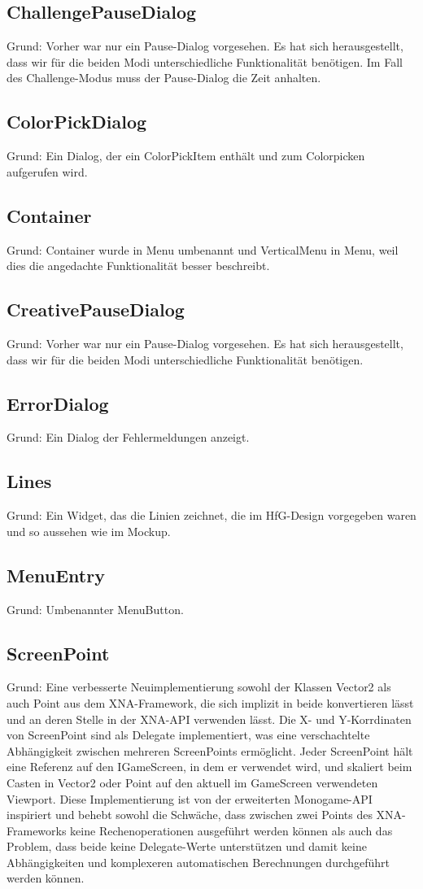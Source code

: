 \subsection{ChallengePauseDialog}
Grund: Vorher war nur ein Pause-Dialog vorgesehen. Es hat sich herausgestellt, dass wir für die beiden Modi unterschiedliche Funktionalität benötigen. Im Fall des Challenge-Modus muss der Pause-Dialog die Zeit anhalten.
\subsection{ColorPickDialog}
Grund: Ein Dialog, der ein ColorPickItem enthält und zum Colorpicken aufgerufen wird.
\subsection{Container}
Grund: Container wurde in Menu umbenannt und VerticalMenu in Menu, weil dies die angedachte Funktionalität besser beschreibt.
\subsection{CreativePauseDialog}
Grund: Vorher war nur ein Pause-Dialog vorgesehen. Es hat sich herausgestellt, dass wir für die beiden Modi unterschiedliche Funktionalität benötigen.
\subsection{ErrorDialog}
Grund: Ein Dialog der Fehlermeldungen anzeigt.
\subsection{Lines}
Grund: Ein Widget, das die Linien zeichnet, die im HfG-Design vorgegeben waren und so aussehen wie im Mockup.
\subsection{MenuEntry}
Grund: Umbenannter MenuButton.
\subsection{ScreenPoint}
Grund: Eine verbesserte Neuimplementierung sowohl der Klassen Vector2 als auch Point aus dem XNA-Framework, die sich implizit in beide konvertieren lässt und an deren Stelle in der XNA-API verwenden lässt. Die X- und Y-Korrdinaten von ScreenPoint sind als Delegate implementiert, was eine verschachtelte Abhängigkeit zwischen mehreren ScreenPoints ermöglicht. Jeder ScreenPoint hält eine Referenz auf den IGameScreen, in dem er verwendet wird, und skaliert beim Casten in Vector2 oder Point auf den aktuell im GameScreen verwendeten Viewport. Diese Implementierung ist von der erweiterten Monogame-API inspiriert und behebt sowohl die Schwäche, dass zwischen zwei Points des XNA-Frameworks keine Rechenoperationen ausgeführt werden können als auch das Problem, dass beide keine Delegate-Werte unterstützen und damit keine Abhängigkeiten und komplexeren automatischen Berechnungen durchgeführt werden können.
